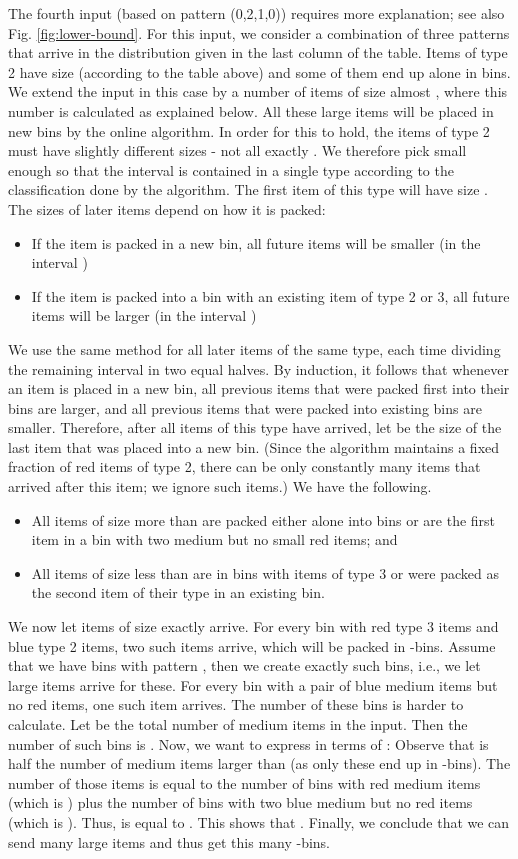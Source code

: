 The fourth input (based on pattern (0,2,1,0)) requires more explanation; see also Fig. \ref{fig:lower-bound}.
For this input, we consider a combination of three patterns that arrive in the distribution given in the last column of the table.
Items of type 2 have size  (according to the
table above) and some of them end up
alone in bins. We extend the input in this case by a number of items of size
almost , where this number is 
calculated as explained below.
All these large items will be placed in new bins by the online algorithm.
In order for this to hold, the items of type 2 must have slightly different
sizes - not all exactly .
We therefore pick  small enough so that the interval
 is contained in a single type according to the classification
done by the algorithm. The first item of this type
will have size . The sizes of later items depend on how it is packed:
\begin{itemize}
	\item If the item is packed in a new bin, all future items
	will be smaller (in the interval )
	\item If the item is packed into a bin with an existing item of type 2 or 3,
	all future items will be larger (in the interval )
\end{itemize}
We use the same method for all later items of the same type, each time dividing the
remaining interval in two equal halves. 
By induction, it follows that whenever an item is placed in a new bin,
all previous items that were packed first into their bins are larger, and
all previous items that were packed into existing bins are smaller.
Therefore,
after all items of this type have arrived, let  be the size of the last item
that was placed into a new bin. 
(Since the algorithm maintains a fixed fraction of red items of type 2,
there can be only constantly many items that arrived after this item; we ignore such
items.)
We have the following.
\begin{itemize}
	\item All items of size more than  are packed either alone into bins or are the first item in a bin with two medium but no small red items; and 
	\item All items of size less than  are in bins with items of type 3 or were
	packed as the second item of their type in an existing bin.
\end{itemize}
We now let items of size exactly  arrive. 
For every bin with red type 3 items and blue type 2 items, two such items arrive, which will be packed in -bins.
Assume that we have  bins with pattern , then we create exactly  such bins, i.e., we let  large items arrive for these.
For every bin with a pair of blue medium items but no red items, one such  item arrives.
The number of these bins is harder to calculate. Let  be the total number of medium items in the input. 
Then the number of such bins is . Now, we want to express  in terms of : Observe that  is half the number of medium items larger than  (as only these end up in -bins). The number of those items is equal to the number of bins with red medium items (which is ) plus the number of bins with two blue medium but no red items (which is ). Thus,  is equal to . This shows that . Finally, we conclude that we can send   many large items and thus get this many -bins. 

